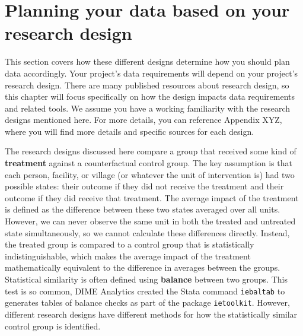 


\section{Planning your data based on your research design}

This section covers how these different designs
determine how you should plan data accordingly.
Your project's data requirements will depend on your project's research design.
There are many published resources about research design,
so this chapter will focus specifically on how the design impacts data requirements
and related tools.
We assume you have a working familiarity
with the research designs mentioned here.
For more details, you can reference Appendix XYZ,
where you will find more details and specific sources for each design.

The research designs discussed here compare a group that received
some kind of \textbf{treatment}
against a counterfactual control group.
The key assumption is that each
person, facility, or village (or whatever the unit of intervention is)
had two possible states: their outcome if they did not receive the treatment
and their outcome if they did receive that treatment.
The average impact of the treatment is defined as
the difference between these two states averaged over all units.
However, we can never observe the same unit
in both the treated and untreated state simultaneously,
so we cannot calculate these differences directly.
Instead, the treated group is compared to a control group
that is statistically indistinguishable,
which makes the average impact of the treatment
mathematically equivalent to the difference in averages between the groups.
Statistical similarity is often defined using \textbf{balance} between two groups.
This test is so common,
DIME Analytics created the Stata command \texttt{iebaltab}
to generates tables of balance checks
as part of the package \texttt{ietoolkit}.
However, different research designs have different methods
for how the statistically similar control group is identified.

